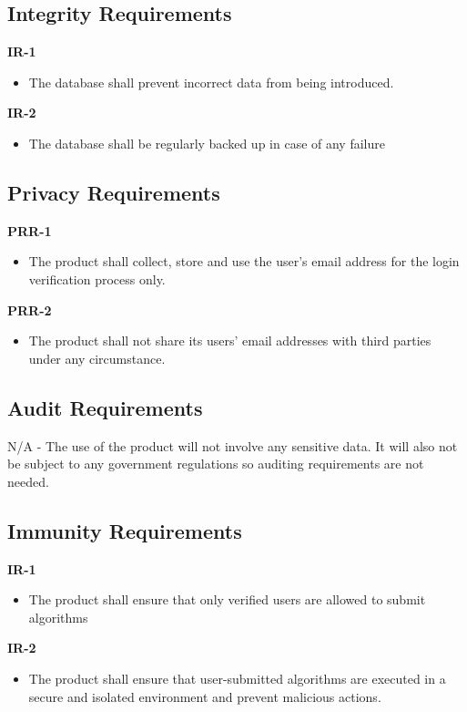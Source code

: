 \documentclass[12pt]{article}
\begin{document}
\subsection{Integrity Requirements}
\textbf{IR-1}
\begin{itemize}
    \item The database shall prevent incorrect data from being introduced.
\end{itemize}
\textbf{IR-2}
\begin{itemize}
    \item The database shall be regularly backed up in case of any failure
\end{itemize}

\subsection{Privacy Requirements}
\textbf{PRR-1}
\begin{itemize}
    \item The product shall collect, store and use the user’s email address for the login verification process only.
\end{itemize}
\textbf{PRR-2}
\begin{itemize}
    \item The product shall not share its users’ email addresses with third parties under any circumstance. 
\end{itemize}
\subsection{Audit Requirements}
N/A - The use of the product will not involve any sensitive data. It will also not be subject to any government regulations so auditing requirements are not needed.

\subsection{Immunity Requirements}
\textbf{IR-1}
\begin{itemize}
    \item The product shall ensure that only verified users are allowed to submit algorithms
\end{itemize}
\textbf{IR-2}
\begin{itemize}
    \item The product shall ensure that user-submitted algorithms are executed in a secure and isolated environment and prevent malicious actions.
\end{itemize}
\end{document}
